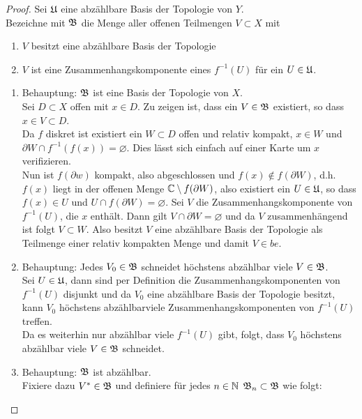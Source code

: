 \begin{proof}
  Sei $\mathfrak{U}$ eine abzählbare Basis der Topologie von $Y$. \\
  Bezeichne mit $\mathfrak{B}$ die Menge aller offenen Teilmengen $V \subset X$
  mit
  \begin{enumerate}
  \item $V$ besitzt eine abzählbare Basis der Topologie
  \item $V$ ist eine Zusammenhangskomponente eines $f^{-1}(U)$ für ein
    $U \in \mathfrak{U}$.
  \end{enumerate}
  \begin{enumerate}
  \item Behauptung: $\mathfrak{B}$ ist eine Basis der Topologie von $X$. \\
    Sei $D \subset X$ offen mit $x \in D$. Zu zeigen ist, dass ein $V
    \in \mathfrak{B}$ existiert, so dass $x \in V \subset D$. \\
    Da $f$ diskret ist existiert ein $W \subset D$ offen und relativ
    kompakt, $x \in W$ und $\partial W \cap f^{-1}(f(x)) =
    \varnothing$. Dies lässt sich einfach auf einer Karte um $x$
    verifizieren. \\
    Nun ist $f(\partial w)$ kompakt, also abgeschlossen und $f(x)
    \notin f(\partial W)$, d.h. $f(x)$ liegt in der offenen Menge $\mathbb{C}
    \setminus f(\partial W)$, also existiert ein $U \in \mathfrak{U}$, so dass
    $f(x) \in U$ und $U \cap f(\partial W) = \varnothing$. Sei  $V$
    die Zusammenhangskomponente von $f^{-1}(U)$, die $x$ enthält. Dann
    gilt $V \cap \partial W = \varnothing$ und da $V$ zusammenhängend
    ist folgt $V \subset W$. Also besitzt $V$ eine abzählbare Basis
    der Topologie als Teilmenge einer relativ kompakten Menge und
    damit $V \in be$.
  \item Behauptung: Jedes $V_0 \in \mathfrak{B}$ schneidet höchstens abzählbar
    viele $V \in \mathfrak{B}$. \\
    Sei $U \in \mathfrak{U}$, dann sind per Definition die
    Zusammenhangskomponenten von $f^{-1}(U)$ disjunkt und da $V_0$
    eine abzählbare Basis der Topologie besitzt, kann $V_0$ höchstens
    abzählbarviele Zusammenhangskomponenten von $f^{-1}(U)$
    treffen. \\
    Da es weiterhin nur abzählbar viele $f^{-1}(U)$ gibt, folgt, dass
    $V_0$ höchstens abzählbar viele $V \in \mathfrak{B}$ schneidet.
  \item Behauptung: $\mathfrak{B}$ ist abzählbar.\\
    Fixiere dazu $V^\ast \in \mathfrak{B}$ und definiere für jedes $n \in \mathbb{N}$
    $\mathfrak{B}_n \subset \mathfrak{B}$ wie folgt: \\

\end{enumerate}
\end{proof}
